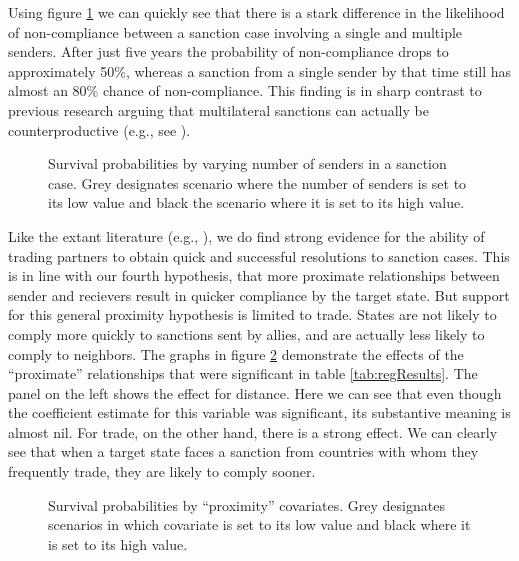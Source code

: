 Using figure \ref{fig:surv1} we can quickly see that there is a stark difference in the likelihood of non-compliance between a sanction case involving a single and multiple senders. After just five years the probability of non-compliance drops to approximately 50\%, whereas a sanction from a single sender by that time still has almost an 80\% chance of non-compliance. This finding is in sharp contrast to previous research arguing that multilateral sanctions can actually be counterproductive (e.g., see \citealp{drezner2000bargaining}).

\begin{figure}[ht]
	\centering
	\caption{Survival probabilities by varying number of senders in a sanction case. Grey designates scenario where the number of senders is set to its low value and black the scenario where it is set to its high value.}
	\resizebox{0.7\textwidth}{!}{}
	\label{fig:surv1}
\end{figure}
\FloatBarrier

Like the extant literature (e.g., \citealp{mclean2010friends}), we do find strong evidence for the ability of trading partners to obtain quick and successful resolutions to sanction cases. This is in line with our fourth hypothesis, that more proximate relationships between sender and recievers result in quicker compliance by the target state. But support for this general proximity hypothesis is limited to trade. States are not likely to comply more quickly to sanctions sent by allies, and are actually less likely to comply to neighbors. The graphs in figure \ref{fig:surv2} demonstrate the effects of the ``proximate'' relationships that were significant in table \ref{tab:regResults}. The panel on the left shows the effect for distance. Here we can see that even though the coefficient estimate for this variable was significant, its substantive meaning is almost nil. For trade, on the other hand, there is a strong effect. We can clearly see that when a target state faces a sanction from countries with whom they frequently trade, they are likely to comply sooner.

\begin{figure}[ht]
	\centering
	\caption{Survival probabilities by ``proximity'' covariates. Grey designates scenarios in which covariate is set to its low value and black where it is set to its high value.}
	\resizebox{1\textwidth}{!}{}	
	\label{fig:surv2}
\end{figure}
\FloatBarrier

